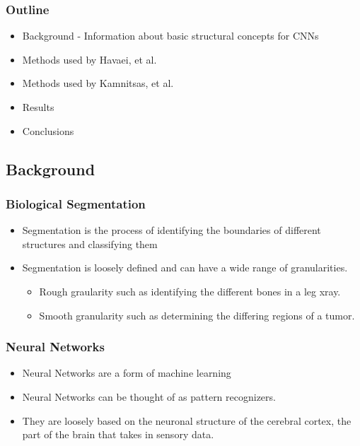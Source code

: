 \documentclass{beamer}
\begin{document}
\begin{frame}
  \frametitle{Outline}
  \tableofcontents[hideallsubsections]
  \begin{itemize}
  	\item Background - Information about basic structural concepts for CNNs
  	\item Methods used by Havaei, et al.
  	\item Methods used by Kamnitsas, et al.
  	\item Results
  	\item Conclusions
  \end{itemize}
\end{frame}

\subsection*{Background}

\begin{frame}
  \frametitle{Biological Segmentation}
  \begin{itemize}
	\item Segmentation is the process of identifying the boundaries of different structures and classifying them
	\pause
	\item Segmentation is loosely defined and can have a wide range of granularities.
	\pause
	\begin{itemize}
	  \item Rough graularity such as identifying the different bones in a leg xray.
	  \pause
	  \item Smooth granularity such as determining the differing regions of a tumor.
	\end{itemize}
  \end{itemize}
\end{frame}

\begin{frame}
  \frametitle{Neural Networks}
  \begin{itemize}
	\item Neural Networks are a form of machine learning
	\pause
	\item Neural Networks can be thought of as pattern recognizers.
	\pause
	\item They are loosely based on the neuronal structure of the cerebral cortex, the part of the brain that takes in sensory data.
  \end{itemize}
\end{frame}
\end{document}
